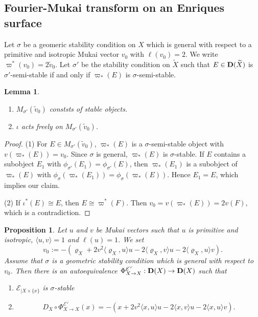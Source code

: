 \documentclass[leqno,11pt]{amsart}
\newtheorem{Prop}[Thm]{Proposition}
\newtheorem{Lem}[Thm]{Lemma}
\theoremstyle{definition}
\def\EE{\ensuremath{\mathcal E}}
\begin{document}
\subsection{Fourier-Mukai transform on an Enriques surface}

Let $\sigma$ be a geomeric stability condition on $X$ which is
general with 
respect to a primitive and isotropic Mukai vector $v_0$ with
$\ell(v_0)=2$.
We write $\varpi^*(v_0)=2 \tilde{v}_0$.
Let $\sigma'$ be the stability condition on $\widetilde{X}$
such that $E \in {\bf D}(\widetilde{X})$ is $\sigma'$-semi-stable
if and only if $\varpi_*(E)$ is $\sigma$-semi-stable.
\begin{Lem}\label{lem:v_0:general}
\begin{enumerate}
\item[(1)]
$M_{\sigma'}(\tilde{v}_0)$ conststs of stable objects.
\item[(2)]
$\iota$ acts freely on $M_{\sigma'}(\tilde{v}_0)$.
\end{enumerate}
\end{Lem}

\begin{proof}
(1) For $E \in M_{\sigma'}(\tilde{v}_0)$,
$\varpi_*(E)$ is a $\sigma$-semi-stable object
with $v(\varpi_*(E))=v_0$.
Since $\sigma$ is general,
$\varpi_*(E)$ is $\sigma$-stable.
If $E$ contains a subobject $E_1$ with
$\phi_{\sigma'}(E_1)=\phi_{\sigma'}(E)$, then
$\varpi_*(E_1)$ is a subobject of $\varpi_*(E)$
with $\phi_\sigma(\varpi_*(E_1))=\phi_\sigma(\varpi_*(E))$.
Hence $E_1=E$, which implies our claim.

(2)
If $\iota^*(E) \cong E$, then
$E \cong \varpi^*(F)$.
Then $v_0=v(\varpi_*(E))=2v(F)$, which is a contradiction.
\end{proof}  





\begin{Prop}\label{prop:Enriques-refl}
Let $u$ and $v$ be Mukai vectors such that
$u$ is primitive and isotropic,
$\langle u,v \rangle=1$ and $\ell(u)=1$.
We set
$$
v_0:=-(\varrho_X+2v^2 \langle \varrho_X,u \rangle u
-2\langle \varrho_X,v \rangle u-2
\langle \varrho_X,u \rangle v).
$$
Assume that $\sigma$ is a geometric stability condition
which is general with respect to $v_0$.
Then there is an autoequivalence 
$\Phi_{X \to X}^{\EE^{\vee}}:{\bf D}(X) \to {\bf D}(X)$
such that 
\begin{enumerate}
\item[(1)]
$\EE_{|X \times \{x \}}$ is $\sigma$-stable
\item[(2)]
\begin{equation}
D_X \circ \Phi_{X \to X}^{\EE^{\vee}}(x)=
-(x+2v^2 \langle x,u \rangle u-2\langle x,v \rangle u-
2\langle x,u \rangle v).
\end{equation}
\end{enumerate}
\end{Prop}
\end{document}

